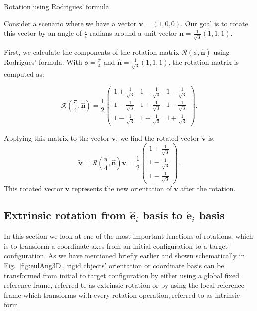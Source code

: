 \documentclass{article}
\def\nh{\hat{\mathbf{n}}}
\def\eh{\hat{\mathbf{e}}}
\def\et{\tilde{\mathbf{e}}}
\def\vt{\tilde{\mathbf{v}}}
\def\R{\mathcal{R}}
\def\nh{\hat{\mathbf{n}}}
\begin{document}
\begin{egsBox}[label={egs:rot3Dex1}, float, floatplacement=t]{Rotation using Rodrigues' formula}
  
    \footnotesize
    Consider a scenario where we have a vector $\mathbf{v} = (1, 0, 0)$. Our goal is to rotate this vector by an angle of $\frac{\pi}{4}$ radians around a unit vector $\mathbf{n} = \frac{1}{\sqrt{3}}(1, 1, 1)$.

    First, we calculate the components of the rotation matrix $\R(\phi, \nh)$ using Rodrigues' formula. With $\phi = \frac{\pi}{4}$ and $\nh = \frac{1}{\sqrt{3}}(1, 1, 1)$, the rotation matrix is computed as:

    \[
    \R(\frac{\pi}{4}, \nh) = \frac{1}{2} \begin{pmatrix}
        1+\frac{1}{\sqrt{3}} & 1-\frac{1}{\sqrt{3}} & 1-\frac{1}{\sqrt{3}} \\
        1-\frac{1}{\sqrt{3}} & 1+\frac{1}{\sqrt{3}} & 1-\frac{1}{\sqrt{3}} \\
        1-\frac{1}{\sqrt{3}} & 1-\frac{1}{\sqrt{3}} & 1+\frac{1}{\sqrt{3}}
    \end{pmatrix}.
    \]

    Applying this matrix to the vector $\mathbf{v}$, we find the rotated vector $\vt$ is,
    \[
    \vt = \R(\frac{\pi}{4}, \nh) \mathbf{v} = \frac{1}{2} \begin{pmatrix}
        1+\frac{1}{\sqrt{3}} \\
        1-\frac{1}{\sqrt{3}} \\
        1-\frac{1}{\sqrt{3}}
    \end{pmatrix}.
    \]
    This rotated vector $\vt$ represents the new orientation of $\mathbf{v}$ after the rotation.
\end{egsBox}

\subsection{Extrinsic rotation from \texorpdfstring{$\eh_i$}{ehi} basis to \texorpdfstring{$\et_i$}{eti} basis}\label{sec:ex2int}
In this section we look at one of the most important functions of rotations, which is to transform a coordinate axes from an initial configuration to a target configuration. As we have mentioned briefly earlier and shown schematically in Fig.~\ref{fig:eulAng3D}, rigid objects' orientation or coordinate basis can be transformed from initial to target configuration by either using a global fixed reference frame, referred to as extrinsic rotation or by using the local reference frame which transforms with every rotation operation, referred to as intrinsic form.
\end{document}
